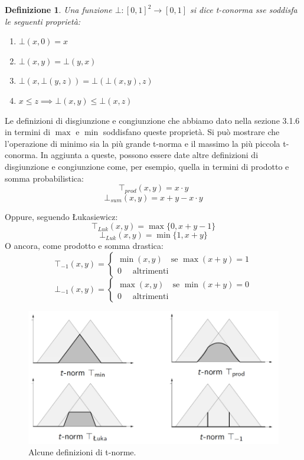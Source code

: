 \documentclass[10pt,a4paper]{article}
\newtheorem{definition}{Definizione}
\begin{document}
\begin{definition}
Una funzione $\bot: [0,1]^2 \to [0,1]$ si dice \emph{t-conorma} sse soddisfa le seguenti proprietà:
\begin{enumerate}
\item{$\bot(x,0) = x$}
\item{$\bot(x,y) = \bot(y,x)$}
\item{$\bot(x,\bot(y,z)) = \bot(\bot(x,y),z)$}
\item{$x \leq z \implies \bot(x,y) \leq \bot(x,z)$}
\end{enumerate}
\end{definition}

Le definizioni di disgiunzione e congiunzione che abbiamo dato nella sezione 3.1.6 in termini di $\max$ e $\min$ soddisfano queste proprietà. Si può mostrare che l'operazione di minimo sia la più grande t-norma e il massimo la più piccola t-conorma. In aggiunta a queste, possono essere date altre definizioni di disgiunzione e congiunzione come, per esempio, quella in termini di prodotto e somma probabilistica:
$$
\top_{prod}(x,y) = x \cdot y
$$
$$
\bot_{sum} (x,y) = x + y - x \cdot y
$$

Oppure, seguendo Łukasiewicz:
$$
\top_{Luk}(x,y) = \max\{0,x + y - 1\}
$$
$$
\bot_{Luk}(x,y) = \min\{1,x + y\}
$$
O ancora, come prodotto e somma drastica:
$$
\top_{-1}(x,y) = \begin{cases}
				\min(x,y) \quad \text{se } \max(x+y) = 1 \\
				0 \quad \text{ altrimenti}  
				\end{cases}
$$
$$
\bot_{-1}(x,y) = \begin{cases}
				\max(x,y) \quad \text{se } \min(x+y) = 0 \\
				0 \quad \text{ altrimenti}  
				\end{cases}
$$

\begin{figure}
\centering
\includegraphics[scale=0.3]{img/tnorme.png}
\caption{Alcune definizioni di t-norme.}
\label{fig:27}
\end{figure}
\end{document}
